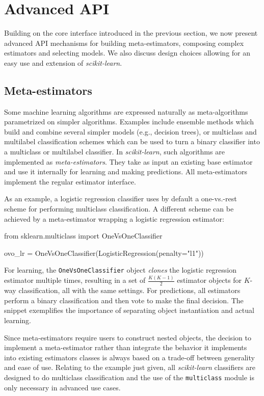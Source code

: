 \documentclass{llncs}
\newcommand{\sklearn}{\textit{scikit-learn}\xspace}
\begin{document}
\section{Advanced API}

\label{sec:advanced-api}

Building on the core interface introduced in the previous section, we now
present advanced API mechanisms for building meta-estimators,
composing complex estimators and selecting models. We also discuss design
choices allowing for an easy use and extension of \sklearn.

\subsection{Meta-estimators}

Some machine learning algorithms are expressed naturally
as meta-algorithms parametrized on simpler algorithms.
Examples include ensemble methods which
build and combine several simpler models (e.g., decision trees), or multiclass
and multilabel classification schemes which can be used to turn a binary
classifier into a multiclass or multilabel classifier. In \sklearn, such algorithms are
implemented as \textit{meta-estimators}. They take as input an existing base
estimator and use it internally for learning and making predictions.
All meta-estimators implement the regular estimator interface.

As an example, a logistic regression classifier
uses by default a one-vs.-rest scheme
for performing multiclass classification.
A different scheme can be achieved
by a meta-estimator wrapping a logistic regression estimator:
\begin{pythoncode}
from sklearn.multiclass import OneVsOneClassifier

ovo_lr = OneVsOneClassifier(LogisticRegression(penalty="l1"))
\end{pythoncode}
For learning, the \texttt{OneVsOneClassifier} object
\textit{clones} the logistic regression estimator multiple times,
resulting in a set of $\frac{K(K-1)}{2}$ estimator objects
for $K$-way classification,
all with the same settings.
For predictions, all estimators perform a binary classification and then vote to make the final decision.
The snippet exemplifies the importance
of separating object instantiation and actual learning.

Since meta-estimators require users to construct nested objects,
the decision to implement a meta-estimator
rather than integrate the behavior it implements
into existing estimators classes
is always based on a trade-off between generality and ease of use.
Relating to the example just given,
all \sklearn classifiers are designed to do multiclass classification
and the use of the \texttt{multiclass} module
is only necessary in advanced use cases.
\end{document}
